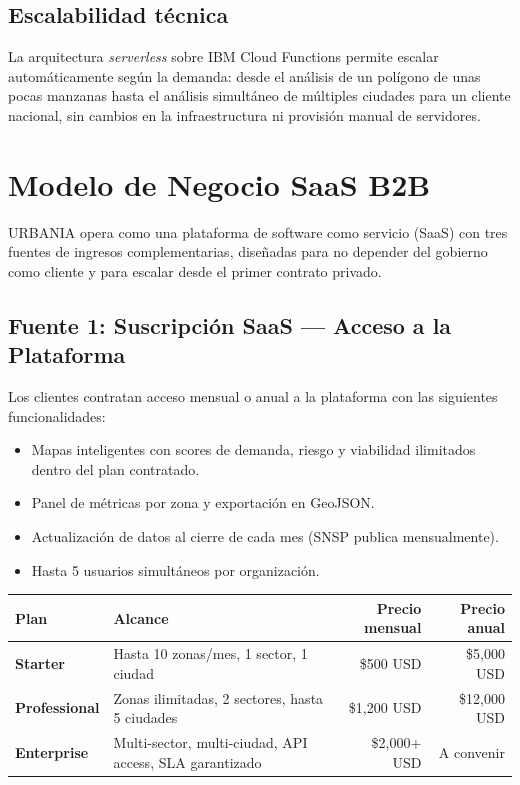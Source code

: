 \documentclass[12pt,a4paper]{article}
\begin{document}
\subsection{Escalabilidad técnica}

La arquitectura \textit{serverless} sobre IBM Cloud Functions permite escalar automáticamente según la demanda: desde el análisis de un polígono de unas pocas manzanas hasta el análisis simultáneo de múltiples ciudades para un cliente nacional, sin cambios en la infraestructura ni provisión manual de servidores.


\newpage
\section{Modelo de Negocio SaaS B2B}

URBANIA opera como una plataforma de software como servicio (SaaS) con tres fuentes de ingresos complementarias, diseñadas para no depender del gobierno como cliente y para escalar desde el primer contrato privado.

\subsection{Fuente 1: Suscripción SaaS — Acceso a la Plataforma}

Los clientes contratan acceso mensual o anual a la plataforma con las siguientes funcionalidades:

\begin{itemize}[leftmargin=1.5cm, itemsep=3pt]
  \item Mapas inteligentes con scores de demanda, riesgo y viabilidad ilimitados dentro del plan contratado.
  \item Panel de métricas por zona y exportación en GeoJSON.
  \item Actualización de datos al cierre de cada mes (SNSP publica mensualmente).
  \item Hasta 5 usuarios simultáneos por organización.
\end{itemize}

\begin{table}[H]
\centering
\small
\renewcommand{\arraystretch}{1.3}
\begin{tabularx}{\textwidth}{>{\bfseries}l X r r}
\toprule
\rowcolor{grisoscuro}
\color{white}\textbf{Plan} & \color{white}\textbf{Alcance} & \color{white}\textbf{Precio mensual} & \color{white}\textbf{Precio anual} \\
\midrule
Starter & Hasta 10 zonas/mes, 1 sector, 1 ciudad & \$500 USD & \$5{,}000 USD \\
\rowcolor{fondofila}
Professional & Zonas ilimitadas, 2 sectores, hasta 5 ciudades & \$1{,}200 USD & \$12{,}000 USD \\
Enterprise & Multi-sector, multi-ciudad, API access, SLA garantizado & \$2{,}000+ USD & A convenir \\
\bottomrule
\end{tabularx}
\end{table}
\end{document}
